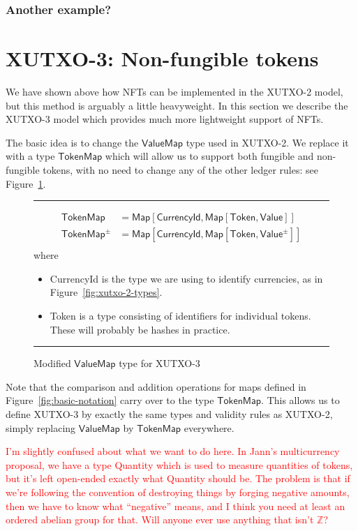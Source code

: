 \documentclass[a4paper]{article}
\newcommand{\red}[1]{\textcolor{red}{#1}}
\newcommand{\s}{\textsf}  %
\theoremstyle{definition}  %
\newcommand\rfskip{7pt}
\newenvironment{ruledfigure}[1]{\begin{figure}[#1]\hrule\vspace{\rfskip}}{\vspace{\rfskip}\hrule\end{figure}}
\newcommand{\Map}[2]{\ensuremath{\s{Map}[#1,#2]}}
\newcommand{\valuemap}{\ensuremath{\s{ValueMap}}}
\newcommand{\tokenmap}{\ensuremath{\s{TokenMap}}}
\newcommand\Z{\ensuremath{\mathbb{Z}}}
\begin{document}
\subsubsection{Another example?}
  
\section{XUTXO-3: Non-fungible tokens}
\label{sec:xutxo-3}

We have shown above how NFTs can be implemented in the XUTXO-2 model,
but this method is arguably a little heavyweight.  In this section we
describe the XUTXO-3 model which provides much more lightweight
support of NFTs.

The basic idea is to change the \valuemap{} type used in XUTXO-2.  We
replace it with a type \tokenmap{} which will allow us to support both
fungible and non-fungible tokens, with no need to change any of the
other ledger rules: see Figure~\ref{fig:xutxo-3-types}.

\begin{ruledfigure}{H}
  \begin{align*}
  \tokenmap &= \Map{\s{CurrencyId}}{\Map{\s{Token}}{\s{Value}}}\\
  \tokenmap^{\pm} &= \Map{\s{CurrencyId}}{\Map{\s{Token}}{\s{Value}^{\pm}}}\\
  \end{align*}
  where
  \begin{itemize}
\item \s{CurrencyId} is the type we are using to identify currencies, as in Figure~\ref{fig:xutxo-2-types}.
\item \s{Token} is a type consisting of identifiers for individual
  tokens.  These will probably be hashes in practice.
  \end{itemize}
  \caption{Modified \valuemap{} type for XUTXO-3}
  \label{fig:xutxo-3-types}
\end{ruledfigure}

\noindent Note that the comparison and addition operations for maps defined in
Figure~\ref{fig:basic-notation} carry over to the type \tokenmap.
This allows us to define XUTXO-3 by exactly the same types and
validity rules as XUTXO-2, simply replacing \valuemap{} by
\tokenmap{} everywhere.

\medskip \noindent\red{I'm slightly confused about what we want to do here.  In
  Jann's multicurrency proposal, we have a type \s{Quantity} which is
  used to measure quantities of tokens, but it's left open-ended
  exactly what \s{Quantity} should be.  The problem is that if we're
  following the convention of destroying things by forging
  negative amounts, then we have to know what ``negative'' means, and
  I think you need at least an ordered abelian group for that.  Will
  anyone ever use anything that isn't \Z?}
\end{document}
